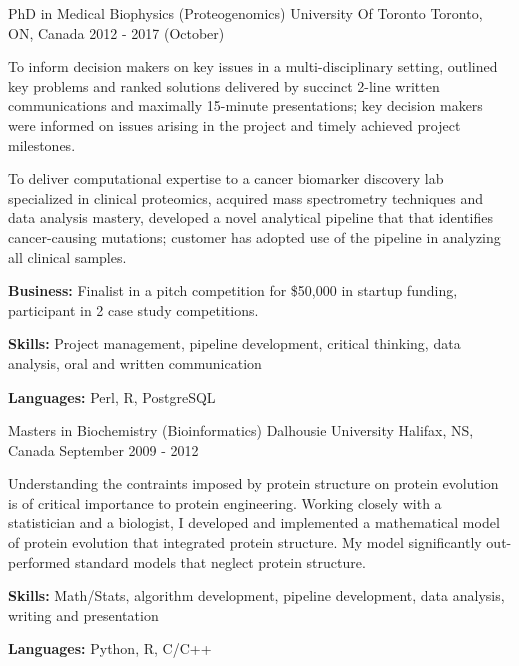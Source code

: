 


\begin{cventries}

\cventry
{PhD in Medical Biophysics (Proteogenomics)} %
{University Of Toronto} %
{Toronto, ON,  Canada} %
	{2012 - 2017 (October)} %
{ %
 \begin{cvitems}
 \item {To inform decision makers on key issues in a multi-disciplinary setting, outlined key problems and ranked solutions delivered by succinct 2-line written communications and maximally 15-minute presentations; key decision makers were informed on issues arising in the project and timely achieved project milestones.}
 \item {To deliver computational expertise to a cancer biomarker discovery lab specialized in clinical proteomics, acquired mass spectrometry techniques and data analysis mastery, developed a novel analytical pipeline that that identifies cancer-causing mutations; customer has adopted use of the pipeline in analyzing all clinical samples.}
 \item {\textbf{Business:} Finalist in a pitch competition for \$50,000 in startup funding, participant in 2 case study competitions.}
 \item {\textbf{Skills:} Project management, pipeline development, critical thinking, data analysis, oral and written communication}
 \item {\textbf{Languages:} Perl, R, PostgreSQL}
 \end{cvitems}
}

\cventry
{Masters in Biochemistry (Bioinformatics)} %
{Dalhousie University} %
{Halifax, NS, Canada} %
{September 2009 - 2012} %
{
 \begin{cvitems}
 \item {Understanding the contraints imposed by protein structure on protein evolution is of critical importance to protein engineering. Working closely with a statistician and a biologist, I developed and implemented a mathematical model of protein evolution that integrated protein structure. My model significantly out-performed standard models that neglect protein structure.}
 \item {\textbf{Skills:} Math/Stats, algorithm development, pipeline development, data analysis, writing and presentation}
 \item {\textbf{Languages:} Python, R, C/C++}
 \end{cvitems}
}


\end{cventries}

